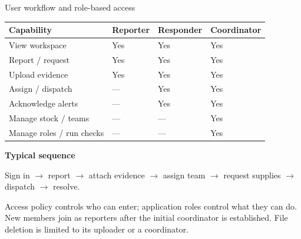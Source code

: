 \documentclass[aspectratio=169,10pt]{beamer}
\begin{document}
\begin{frame}{User workflow and role-based access}
\footnotesize
\begin{tabularx}{\textwidth}{@{}P{3.7cm}YYY@{}}
\toprule
\textbf{Capability}&\textbf{Reporter}&\textbf{Responder}&\textbf{Coordinator}\\\midrule
View workspace & Yes & Yes & Yes\\
Report / request & Yes & Yes & Yes\\
Upload evidence & Yes & Yes & Yes\\
Assign / dispatch & --- & Yes & Yes\\
Acknowledge alerts & --- & Yes & Yes\\
Manage stock / teams & --- & --- & Yes\\
Manage roles / run checks & --- & --- & Yes\\\bottomrule
\end{tabularx}\par
\vspace{.3cm}
\textbf{Typical sequence}\par\vspace{.1cm}
Sign in $\rightarrow$ report $\rightarrow$ attach evidence $\rightarrow$ assign team $\rightarrow$ request supplies $\rightarrow$ dispatch $\rightarrow$ resolve.
\vspace{.25cm}

{\scriptsize\color{QFSlate}Access policy controls who can enter; application roles control what they can do. New members join as reporters after the initial coordinator is established. File deletion is limited to its uploader or a coordinator.}
\end{frame}
\end{document}
